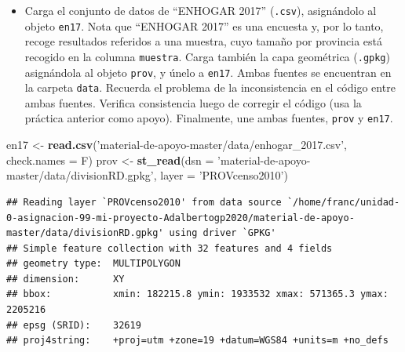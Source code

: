 \documentclass[11pt,]{article}
\newenvironment{Shaded}{\begin{snugshade}}{\end{snugshade}}
\newcommand{\KeywordTok}[1]{\textcolor[rgb]{0.13,0.29,0.53}{\textbf{#1}}}
\newcommand{\DataTypeTok}[1]{\textcolor[rgb]{0.13,0.29,0.53}{#1}}
\newcommand{\DecValTok}[1]{\textcolor[rgb]{0.00,0.00,0.81}{#1}}
\newcommand{\StringTok}[1]{\textcolor[rgb]{0.31,0.60,0.02}{#1}}
\newcommand{\OperatorTok}[1]{\textcolor[rgb]{0.81,0.36,0.00}{\textbf{#1}}}
\newcommand{\NormalTok}[1]{#1}
\providecommand{\tightlist}{%
\setlength{\itemsep}{0pt}\setlength{\parskip}{0pt}}
\begin{document}
\begin{itemize}
\tightlist
\item
  Carga el conjunto de datos de ``ENHOGAR 2017'' (\texttt{.csv}),
  asignándolo al objeto \texttt{en17}. Nota que ``ENHOGAR 2017'' es una
  encuesta y, por lo tanto, recoge resultados referidos a una muestra,
  cuyo tamaño por provincia está recogido en la columna
  \texttt{muestra}. Carga también la capa geométrica (\texttt{.gpkg})
  asignándola al objeto \texttt{prov}, y únelo a \texttt{en17}. Ambas
  fuentes se encuentran en la carpeta \texttt{data}. Recuerda el
  problema de la inconsistencia en el código entre ambas fuentes.
  Verifica consistencia luego de corregir el código (usa la práctica
  anterior como apoyo). Finalmente, une ambas fuentes, \texttt{prov} y
  \texttt{en17}.
\end{itemize}

\begin{Shaded}
\begin{Highlighting}[]
\NormalTok{en17 <-}\StringTok{ }\KeywordTok{read.csv}\NormalTok{(}\StringTok{'material-de-apoyo-master/data/enhogar_2017.csv'}\NormalTok{, }\DataTypeTok{check.names =}\NormalTok{ F)}
\NormalTok{prov <-}\StringTok{ }\KeywordTok{st_read}\NormalTok{(}\DataTypeTok{dsn =} \StringTok{'material-de-apoyo-master/data/divisionRD.gpkg'}\NormalTok{, }\DataTypeTok{layer =} \StringTok{'PROVcenso2010'}\NormalTok{)}
\end{Highlighting}
\end{Shaded}

\begin{verbatim}
## Reading layer `PROVcenso2010' from data source `/home/franc/unidad-0-asignacion-99-mi-proyecto-Adalbertogp2020/material-de-apoyo-master/data/divisionRD.gpkg' using driver `GPKG'
## Simple feature collection with 32 features and 4 fields
## geometry type:  MULTIPOLYGON
## dimension:      XY
## bbox:           xmin: 182215.8 ymin: 1933532 xmax: 571365.3 ymax: 2205216
## epsg (SRID):    32619
## proj4string:    +proj=utm +zone=19 +datum=WGS84 +units=m +no_defs
\end{verbatim}

\begin{Shaded}
\end{Shaded}
\end{document}
